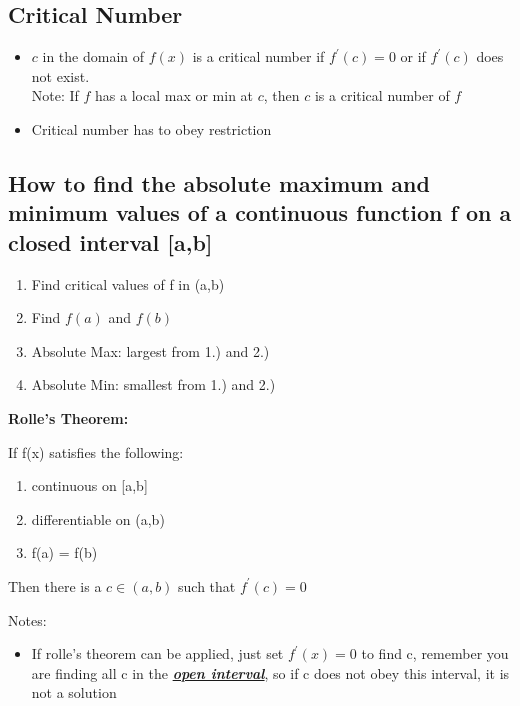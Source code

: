 \documentclass{report}
\begin{document}
    \bigbreak \noindent \bigbreak \noindent 
    \subsection{Critical Number}
    \begin{itemize}
      \item $c$ in the domain of $f(x)$ is a critical number if $f^{\prime}(c)=0$ or if $f^{\prime}(c)$ does not exist. \\
      Note: If $f$ has a local max or min at $c$, then $c$ is a critical number of $f$ 
      \item Critical number has to obey restriction
    \end{itemize}

    \bigbreak \noindent \bigbreak \noindent 
    \subsection{How to find the absolute maximum and minimum values of a continuous function f on a closed interval [a,b]}
      \begin{enumerate}
      \item Find critical values of f in (a,b)
      \item Find $f(a)$ and $f(b)$
      \item Absolute Max: largest from 1.) and 2.) 
      \item Absolute Min: smallest from 1.) and 2.)
    \end{enumerate}

    \bigbreak \noindent \bigbreak \noindent 
      \begin{large}
        \noindent \textbf{Rolle's Theorem:}
      \end{large}
     \bigbreak \noindent 
     If f(x) satisfies the following:
     \begin{enumerate}
       \item continuous on [a,b]
        \item differentiable on (a,b)
        \item f(a) = f(b)
     \end{enumerate}
     \smallbreak \noindent
     Then there is a $c \in (a,b)$ such that $f^{\prime}(c) = 0$ 

     \bigbreak \noindent 
     Notes:
     \begin{itemize}
       \item If rolle's theorem can be applied, just set $f^{\prime}(x) = 0$ to find c, remember you are finding all c in the \textbf{\textit{\underline{open interval}}}, so if c does not obey this interval, it is not a solution
     \end{itemize}
\end{document}

